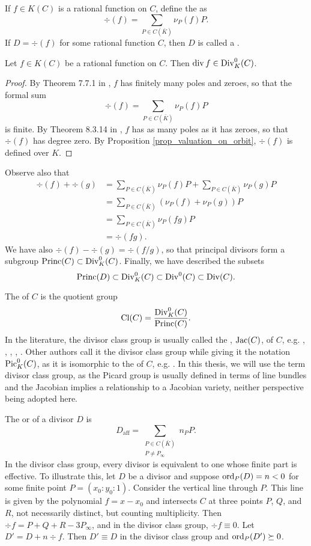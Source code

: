 If $f \in K(C)$ is a rational function on $C$,
define the  as
\[ \div(f) = \sum_{P \in C(\bar K)} \nu_P(f) P. \]
If $D = \div(f)$ for some rational function $C$,
then $D$ is called a .
\begin{proposition}
  Let $f \in K(C)$ be a rational function on $C$.
  Then $\operatorname{div} f \in \operatorname{Div}_K^0(C)$.
\end{proposition}
\begin{proof}
  By Theorem 7.7.1 in \cite{galbraith12}, $f$ has finitely many poles and zeroes, so that the formal sum
  \[ \div(f) = \sum_{P \in C(\bar K)} \nu_P(f) P \]
  is finite.
  By Theorem 8.3.14 in \cite{galbraith12}, $f$ has as many poles as it has zeroes, so that $\div(f)$ has degree zero.
  By Proposition \ref{prop_valuation_on_orbit}, $\div(f)$ is defined over $K$.
\end{proof}
Observe also that
\begin{align*}
  \div(f) + \div(g)
    &= \sum_{P \in C(\bar K)} \nu_P(f) P + \sum_{P \in C(\bar K)} \nu_P(g) P \\
    &= \sum_{P \in C(\bar K)} (\nu_P(f) + \nu_P(g))P \\
    &= \sum_{P \in C(\bar K)} \nu_P(fg)P \\
    &= \div(fg).
\end{align*}
We have also $\div(f) - \div(g) = \div(f/g)$,
so that principal divisors form a subgroup $\operatorname{Princ}(C) \subset \operatorname{Div}_K^0(C)$.
Finally, we have described the subsets
\[ \operatorname{Princ}(D) \subset \operatorname{Div}_K^0(C) \subset \operatorname{Div}^0(C) \subset \operatorname{Div}(C). \]

The  of $C$ is the quotient group
\[ \operatorname{Cl}(C) = \frac {\operatorname{Div}_K^0(C)} {\operatorname{Princ}(C)}. \]
In the literature, the divisor class group is usually called the , $\operatorname{Jac}(C)$, of $C$,
e.g. \cite{arita05-2}, \cite{basiri04}, \cite{flon08}, \cite{harasawa00}, \cite{salem07}.
Other authors call it the divisor class group while giving it the notation $\operatorname{Pic}_K^0(C)$,
as it is isomorphic to the  of $C$,
e.g. \cite{eisenbud95} \cite{galbraith12} \cite{sutherland16}.
In this thesis, we will use the term divisor class group,
as the Picard group is usually defined in terms of line bundles
and the Jacobian implies a relationship to a Jacobian variety,
neither perspective being adopted here.

The  or  of a divisor $D$ is
\[ D_{\text{aff}} = \sum_{\substack{P \in C(\bar K) \\ P \neq P_\infty}} n_P P. \]
In the divisor class group, every divisor is equivalent to one whose finite part is effective.
To illustrate this, let $D$ be a divisor and suppose $\operatorname{ord}_P(D) = n < 0$ for some finite point $P = (x_0 : y_0 : 1)$.
Consider the vertical line through $P$.
This line is given by the polynomial $f = x - x_0$ and intersects $C$ at three points $P$, $Q$, and $R$,
not necessarily distinct, but counting multiplicity.
Then $\div f = P + Q + R - 3P_\infty$, and in the divisor class group, $\div f \equiv 0$.
Let $D' = D + n \div f$.
Then $D' \equiv D$ in the divisor class group and $\operatorname{ord}_P(D') \succeq 0$.

